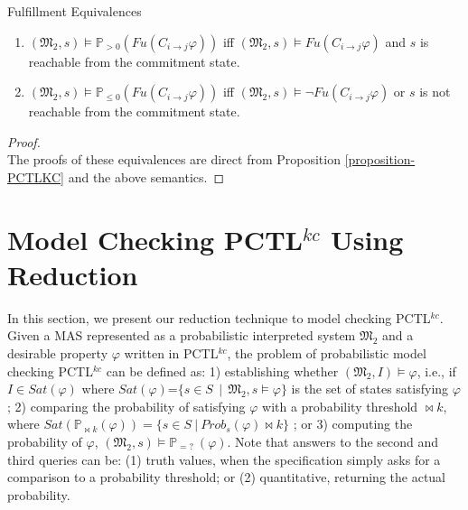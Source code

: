 \begin{theorem}\label{Fulfiilemt-Equivelances} {Fulfillment Equivalences}~

\begin{enumerate}
\item $(\mathfrak{M_2},s)\models \mathbb{P}_{>0} (Fu(C_{i \rightarrow
j}\varphi))$ iff $(\mathfrak{M_2},s)\models Fu(C_{i \rightarrow
j}\varphi)$ and $s$ is reachable from the commitment state.

\item $(\mathfrak{M_2},s)\models \mathbb{P}_{\leq0} (Fu(C_{i \rightarrow
j}\varphi))$ iff $(\mathfrak{M_2},s)\models \neg Fu(C_{i \rightarrow
j}\varphi)$ or $s$ is not reachable from the commitment state.

\end{enumerate}

\end{theorem}

\begin{proof} \hspace{0.5cm} \\
The proofs of these equivalences are direct from Proposition
\ref{proposition-PCTLKC} and the above semantics.

 \end{proof}

\section{Model Checking PCTL$^{kc}$ Using Reduction} \label{sec:model-checking-pctlkc}


In this section, we present our reduction technique to model checking PCTL$^{kc}$. Given a MAS represented as a probabilistic interpreted system $\mathfrak{M_2}$ and a desirable property $\varphi$ written in PCTL$^{kc}$, the problem of probabilistic model checking PCTL$^{kc}$ can be defined as: 1) establishing whether $(\mathfrak{M_2}, I)\models \varphi$,
i.e., if $I \in Sat(\varphi)$ where $Sat(\varphi)$=$\{s\in S ~~|~~
\mathfrak{M_2},s \models \varphi \}$ is the set of states satisfying
$\varphi$; 2) comparing the probability of satisfying $\varphi$
with a probability threshold $\bowtie k$, where
$Sat(\mathbb{P}_{\bowtie k}(\varphi))=\{s\in S ~|~
Prob_s(\varphi)\bowtie k \}$ ; or 3) computing the probability of
$\varphi$, $(\mathfrak{M_2}, s)\models \mathbb{P}_{=?} ~(\varphi)$.
Note that answers to the second and third queries can be: (1)
truth values, when the specification simply asks for a comparison
to a probability threshold; or (2) quantitative, returning the
actual probability.

